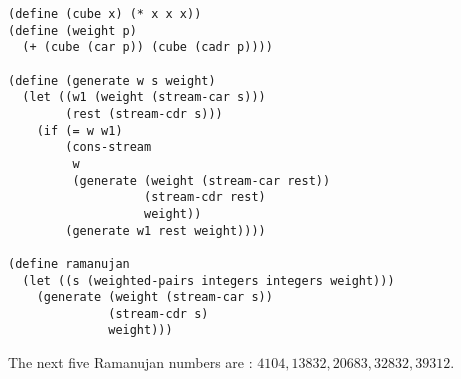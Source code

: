 \documentclass[a4paper,12pt]{article}
\begin{document}
\begin{lstlisting}
(define (cube x) (* x x x))
(define (weight p)
  (+ (cube (car p)) (cube (cadr p))))

(define (generate w s weight)
  (let ((w1 (weight (stream-car s)))
        (rest (stream-cdr s)))
    (if (= w w1)
        (cons-stream
         w
         (generate (weight (stream-car rest))
                   (stream-cdr rest)
                   weight))
        (generate w1 rest weight))))

(define ramanujan
  (let ((s (weighted-pairs integers integers weight)))
    (generate (weight (stream-car s))
              (stream-cdr s)
              weight)))
\end{lstlisting}

The next five Ramanujan numbers are : $4104, 13832, 20683, 32832, 39312$.
\end{document}
